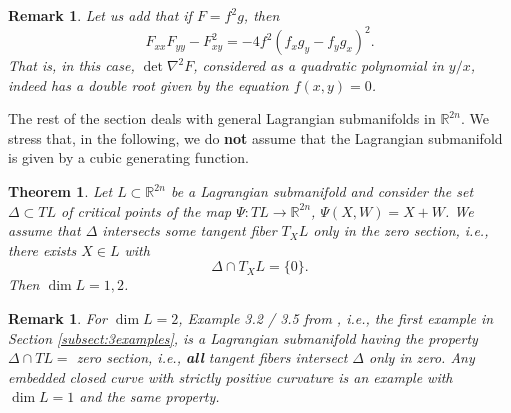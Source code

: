 \documentclass[12pt]{article}
\newtheorem{remark}[lemma]{Remark}
\newtheorem{theorem}{Theorem}
\newcommand{\R}{{\mathbb R}}
\begin{document}
\begin{remark}
{Let us add that if $F=f^2g$, then 
$$
F_{xx}F_{yy}-F_{xy}^2 = -4 f^2 (f_xg_y-f_yg_x)^2.
$$
That is, in this case, $\det \nabla^2F$, considered as a quadratic polynomial in $y/x$, indeed has a double root given by the equation $f(x,y)=0$. 



}
\end{remark}


The rest of the section deals with general Lagrangian submanifolds in $\R^{2n}$. We stress that, in the following, we do \textbf{not} assume that the Lagrangian submanifold is given by a cubic generating function. 

\begin{theorem}
Let $L\subset\R^{2n}$ be a Lagrangian submanifold and consider the set $\Delta\subset TL$ of critical points of the map $\Psi:TL\to\R^{2n}$, $\Psi(X,W)=X+W$. We assume that $\Delta$ intersects some tangent fiber $T_XL$ only in the zero section, i.e., there exists $X\in L$ with
\begin{equation}\nonumber
\Delta\cap T_XL=\{0\}.
\end{equation}
Then $\dim L =1,2$.
\end{theorem}

\begin{remark}
{\rm
For $\dim L=2$, Example 3.2 / 3.5 from \cite{FT2}, i.e., the first example in Section \ref{subsect:3examples}, is a Lagrangian submanifold having the property $\Delta\cap TL=$ zero section, i.e., \textbf{all} tangent fibers intersect $\Delta$ only in zero. Any embedded closed curve with strictly positive curvature is an example with $\dim L=1$ and the same property.
}
\end{remark}
\end{document}

